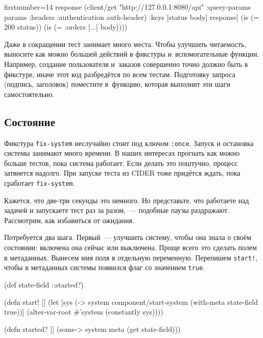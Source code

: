 \else

\begin{english}
  \begin{clojure/lines*}{firstnumber=14}
        response (client/get "http://127.0.0.1:8080/api"
                   {:query-params params
                    :headers {:authentication auth-header}})
        {:keys [status body]} response]
    (is (= 200 status))
    (is (= {:orders [...]} body))))
  \end{clojure/lines*}
\end{english}

\fi

Даже в сокращении тест занимает много места. Чтобы улучшить читаемость, выносите
как можно большей действий в фикстуры и~вспомогательные функции. Например,
создание пользователя и~заказов совершенно точно должно быть в фикстуре, иначе
этот код разбредётся по всем тестам. Подготовку запроса (подпись, заголовок)
поместите в~функцию, которая выполнит эти шаги самостоятельно.

\subsection{Состояние}

Фикстура \verb|fix-system| неслучайно стоит под ключом \verb|:once|. Запуск
и остановка системы занимают много времени. В наших интересах прогнать как можно
больше тестов, пока система работает. Если делать это поштучно, процесс
затянется надолго. При запуске теста из CIDER тоже придётся ждать, пока
сработает \verb|fix-system|.

Кажется, что две-три секунды это немного. Но представьте, что работаете над
задачей и запускаете тест раз за разом,~--- подобные паузы
раздражают. Рассмотрим, как избавиться от ожидания.


Потребуется два шага. Первый~--- улучшить систему, чтобы она знала о своём
состоянии: включена она сейчас или выключена. Проще всего это сделать полем в
метаданных. Вынесем имя поля в отдельную переменную. Перепишем \verb|start!|,
чтобы в метаданных системы появился флаг со значением \verb|true|.

\ifx\devicetype\mobile

\begin{english}
  \begin{clojure}
(def state-field ::started?)

(defn start! []
  (let [sys
        (-> system
            component/start-system
            (with-meta
              {state-field true}))]
    (alter-var-root
      #'system (constantly sys))))

(defn started? []
  (some-> system meta (get state-field)))
  \end{clojure}
\end{english}

